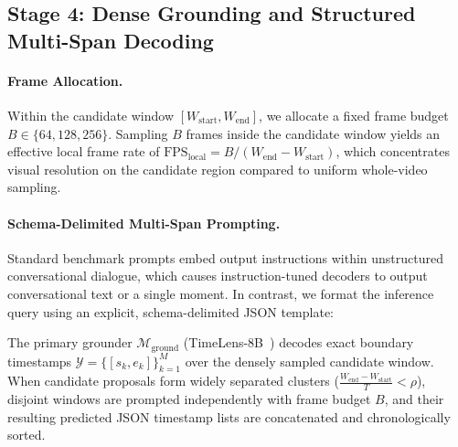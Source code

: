 \subsection{Stage 4: Dense Grounding and Structured Multi-Span Decoding}
\label{sec:stage4}

\paragraph{Frame Allocation.} Within the candidate window $[W_{\text{start}}, W_{\text{end}}]$, we allocate a fixed frame budget $B \in \{64, 128, 256\}$. Sampling $B$ frames inside the candidate window yields an effective local frame rate of $\mathrm{FPS}_{\text{local}} = B / (W_{\text{end}} - W_{\text{start}})$, which concentrates visual resolution on the candidate region compared to uniform whole-video sampling.

\paragraph{Schema-Delimited Multi-Span Prompting.} Standard benchmark prompts embed output instructions within unstructured conversational dialogue, which causes instruction-tuned decoders to output conversational text or a single moment. In contrast, we format the inference query using an explicit, schema-delimited JSON template:
\begin{center}
\end{center}
The primary grounder $\mathcal{M}_{\text{ground}}$ (TimeLens-8B~\cite{timelens2024}) decodes exact boundary timestamps $\mathcal{Y} = \{[s_k, e_k]\}_{k=1}^M$ over the densely sampled candidate window. When candidate proposals form widely separated clusters ($\frac{W_{\text{end}} - W_{\text{start}}}{T} < \rho$), disjoint windows are prompted independently with frame budget $B$, and their resulting predicted JSON timestamp lists are concatenated and chronologically sorted.
